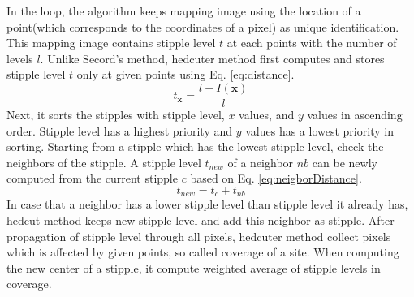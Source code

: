 \documentclass[11pt]{article}
\begin{document}
In the loop, the algorithm keeps mapping image using the location of a point(which corresponds to the coordinates of a pixel) as unique identification. 
This mapping image contains stipple level $t$ at each points with the number of levels $l$.
Unlike Secord's method\cite{secord02}, hedcuter method first computes and stores stipple level $t$ only at given points using Eq. \ref{eq:distance}. 
\begin{equation}\label{eq:distance}
t_{\mathbf{x}}=\frac{l-I(\mathbf{x})}{l}%
\end{equation}
Next, it sorts the stipples with stipple level, $x$ values, and $y$ values in ascending order. 
Stipple level has a highest priority and $y$ values has a lowest priority in sorting. 
Starting from a stipple which has the lowest stipple level, check the neighbors of the stipple.
A stipple level $t_{new}$ of a neighbor $nb$ can be newly computed from the current stipple $c$ based on Eq. \ref{eq:neigborDistance}.
\begin{equation}\label{eq:neigborDistance}
t_{new}=t_{c} + t_{nb}
\end{equation}
In case that a neighbor has a lower stipple level than stipple level it already has, hedcut method keeps new stipple level and add this neighbor as stipple.  
After propagation of stipple level through all pixels, hedcuter method collect pixels which is affected by given points, so called coverage of a site. 
When computing the new center of a stipple, it compute weighted average of stipple levels in coverage. 
\end{document}
